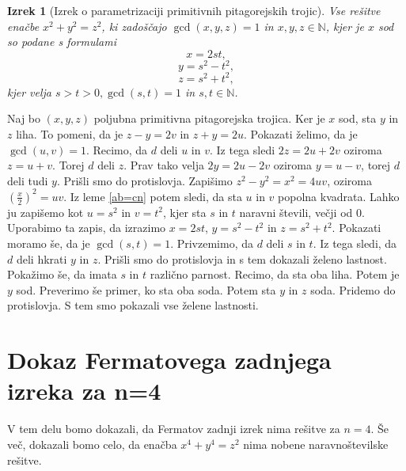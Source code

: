 \documentclass[12pt, a4paper]{article}
\newtheorem{izrek}{Izrek}
\newcommand{\N}{\mathbb N}
\begin{document}
\begin{izrek}[Izrek o parametrizaciji primitivnih pitagorejskih trojic]\label{parametrizacija}
Vse rešitve enačbe $x^2+y^2=z^2$, ki zadoščajo $\gcd(x,y,z) =1$ in $x,y,z\in \N$, kjer je $x$ sod so podane s formulami $$x=2st,$$ $$y=s^2-t^2,$$ $$z=s^2+t^2,$$ kjer velja $s>t>0, \gcd(s,t)=1$ in $s,t\in \N$.
\end{izrek}
\proof
Naj bo $(x,y,z)$ poljubna primitivna pitagorejska trojica. Ker je $x$ sod, sta $y$ in $z$ liha. To pomeni, da je $z-y=2v$ in $z+y=2u$. Pokazati želimo, da je $\gcd (u,v)=1$. Recimo, da $d$ deli $u$ in $v$. Iz tega sledi $2z=2u+2v$ oziroma $z=u+v$. Torej $d$ deli $z$. Prav tako velja $2y=2u-2v$ oziroma $y=u-v$, torej $d$ deli tudi $y$. Prišli smo do protislovja. Zapišimo $z^2-y^2=x^2=4uv$, oziroma $(\frac{x}{2})^2=uv$. Iz leme \ref{ab=cn} potem sledi, da sta $u$ in $v$ popolna kvadrata. Lahko ju zapišemo kot $u=s^2$ in $v=t^2$, kjer sta $s$ in $t$ naravni števili, večji od $0$. Uporabimo ta zapis, da izrazimo $x=2st$, $y=s^2-t^2$ in $z=s^2+t^2$. 
Pokazati moramo še, da je $\gcd (s,t)=1$. Privzemimo, da $d$ deli $s$ in $t$. Iz tega sledi, da $d$ deli hkrati $y$ in $z$. Prišli smo do protislovja in s tem dokazali  želeno lastnost. Pokažimo še, da imata $s$ in $t$ različno parnost. Recimo, da sta oba liha. Potem je $y$ sod. Preverimo še primer, ko sta oba soda. Potem sta $y$ in $z$ soda. Pridemo do protislovja. S tem smo pokazali vse želene lastnosti.
\endproof


\section{Dokaz Fermatovega zadnjega izreka za n=4}


V tem delu bomo dokazali, da Fermatov zadnji izrek nima rešitve za $n=4$. Še več, dokazali bomo celo, da enačba $x^4+y^4=z^2$ nima nobene naravnoštevilske rešitve. 
\end{document}
